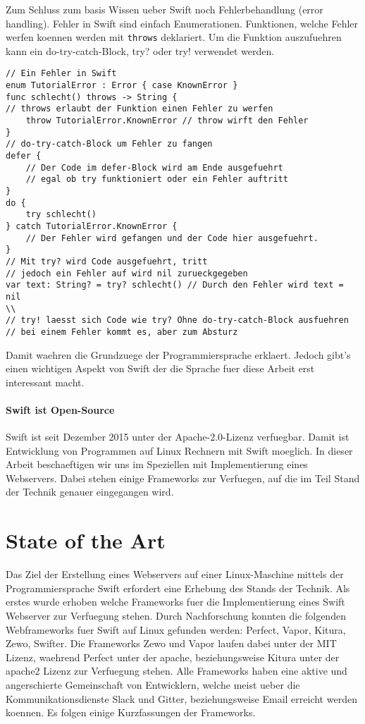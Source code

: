 Zum Schluss zum basis Wissen ueber Swift noch Fehlerbehandlung (error handling). Fehler in Swift sind einfach Enumerationen. Funktionen, welche Fehler werfen koennen werden mit \lstinline{throws} deklariert. Um die Funktion auszufuehren kann ein do-try-catch-Block, try? oder try! verwendet werden.
\begin{lstlisting}
// Ein Fehler in Swift
enum TutorialError : Error { case KnownError }
func schlecht() throws -> String { 
// throws erlaubt der Funktion einen Fehler zu werfen
    throw TutorialError.KnownError // throw wirft den Fehler
}
// do-try-catch-Block um Fehler zu fangen
defer {
    // Der Code im defer-Block wird am Ende ausgefuehrt
    // egal ob try funktioniert oder ein Fehler auftritt
}
do {
    try schlecht()
} catch TutorialError.KnownError {
    // Der Fehler wird gefangen und der Code hier ausgefuehrt.
}
// Mit try? wird Code ausgefuehrt, tritt
// jedoch ein Fehler auf wird nil zurueckgegeben
var text: String? = try? schlecht() // Durch den Fehler wird text = nil
\\
// try! laesst sich Code wie try? Ohne do-try-catch-Block ausfuehren
// bei einem Fehler kommt es, aber zum Absturz 
\end{lstlisting}
Damit waehren die Grundzuege der Programmiersprache erklaert. Jedoch gibt’s einen wichtigen Aspekt von Swift der die Sprache fuer diese Arbeit erst interessant  macht.
\paragraph{Swift ist Open-Source}
\label{para:swiftistopensource}
Swift ist seit Dezember 2015 unter der Apache-2.0-Lizenz verfuegbar\parencite{swiftorg}. Damit ist Entwicklung von Programmen auf Linux Rechnern mit Swift moeglich. In dieser Arbeit beschaeftigen wir uns im Speziellen mit Implementierung eines Webservers.  Dabei stehen einige Frameworks zur Verfuegen, auf die im Teil Stand der Technik genauer eingegangen wird.
\section{State of the Art}
\label{sec:stateoftheart}
Das Ziel der Erstellung eines Webservers auf einer Linux-Maschine mittels der Programmiersprache Swift erfordert eine Erhebung des Stands der Technik. Als erstes wurde erhoben welche Frameworks fuer die Implementierung eines Swift Webserver zur Verfuegung stehen. Durch Nachforschung konnten die folgenden Webframeworks fuer Swift auf Linux gefunden werden:  Perfect\parencite{perfect}, Vapor\parencite{vapor}, Kitura\parencite{kitura}, Zewo\parencite{zewo}, Swifter\parencite{swifter}. Die Frameworks Zewo und Vapor laufen dabei unter der MIT Lizenz, waehrend Perfect unter der apache, beziehungsweise Kitura unter der apache2 Lizenz zur Verfuegung stehen. Alle Frameworks haben eine aktive und angerschierte Gemeinschaft von Entwicklern, welche meist ueber die Kommunikationsdienste Slack und Gitter, beziehungsweise Email erreicht werden koennen. Es folgen einige Kurzfassungen der Frameworks. 
